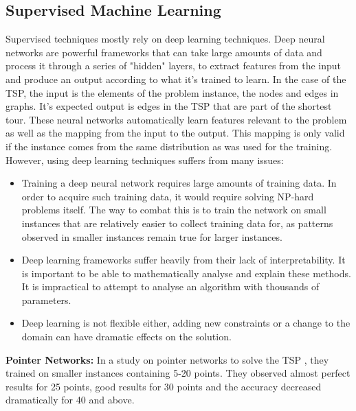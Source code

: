 \documentclass[]{UCD_CS_FYP_Report}
\begin{document}
\subsection{Supervised Machine Learning}
Supervised techniques mostly rely on deep learning techniques. Deep neural networks are powerful frameworks that can take large amounts of data and process it through a series of "hidden" layers, to extract features from the input and produce an output according to what it's trained to learn. In the case of the TSP, the input is the elements of the problem instance, the nodes and edges in graphs. It’s expected output is edges in the TSP that are part of the shortest tour. These neural networks automatically learn features relevant to the problem as well as the mapping from the input to the output. This mapping is only valid if the instance comes from the same distribution as was used for the training. However, using deep learning techniques suffers from many issues:
\begin{itemize}
    \item Training a deep neural network requires large amounts of training data. In order to acquire such training data, it would require solving NP-hard problems itself. The way to combat this is to train the network on small instances that are relatively easier to collect training data for, as patterns observed in smaller instances remain true for larger instances. 
    \item Deep learning frameworks suffer heavily from their lack of interpretability. It is important to be able to mathematically analyse and explain these methods. It is impractical to attempt to analyse an algorithm with thousands of parameters.
    \item Deep learning is not flexible either, adding new constraints or a change to the domain can have dramatic effects on the solution.
\end{itemize}

\textbf{Pointer Networks:} 
In a study on pointer networks to solve the TSP \cite{NIPS2015_5866}, they trained on smaller instances containing 5-20 points. They observed almost perfect results for 25 points, good results for 30 points and the accuracy decreased dramatically for 40 and above.
\end{document}
